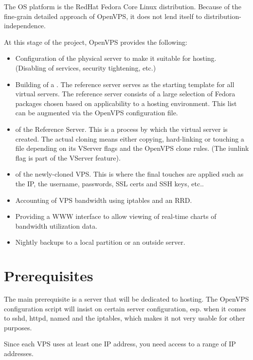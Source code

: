 The OS platform is the RedHat Fedora Core Linux distribution. Because
of the fine-grain detailed approach of OpenVPS, it does not lend
itself to distribution-independence.

At this stage of the project, OpenVPS provides the following:

\begin{itemize}

\item
  Configuration of the physical server to make it suitable for
  hosting. (Disabling of services, security tightening, etc.)

\item
  Building of a . The reference server serves
  as the starting template for all virtual servers. The reference
  server consists of a large selection of Fedora packages chosen
  based on applicability to a hosting environment. This list can be
  augmented via the OpenVPS configuration file.

\item
   of the Reference Server. This is a process by which
  the virtual server is created. The actual cloning means either
  copying, hard-linking or touching a file depending on its VServer
  flags and the OpenVPS clone rules. (The iunlink flag is part of
  the VServer  feature).

\item
   of the newly-cloned VPS. This is where the final
  touches are applied such as the IP, the username, passwords, SSL
  certs and SSH keys, etc..

\item
  Accounting of VPS bandwidth using iptables and an RRD. 

\item
  Providing a WWW interface to allow viewing of real-time charts of
  bandwidth utilization data.

\item
  Nightly backups to a local partition or an outside server.

\end{itemize}

\section{Prerequisites\label{intr-prereq}}

The main prerequisite is a server that will be dedicated to
hosting. The OpenVPS configuration script will insist on certain
server configuration, esp. when it comes to sshd, httpd, named and the
iptables, which makes it not very usable for other purposes.

Since each VPS uses at least one IP address, you need access to a
range of IP addresses. 







